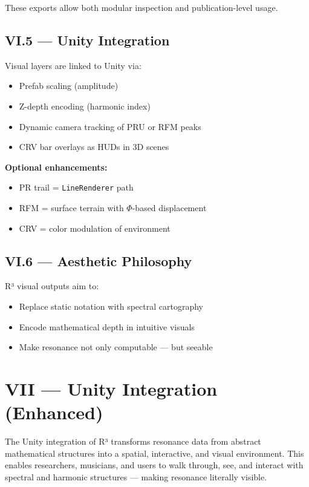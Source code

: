 \documentclass{article}
\begin{document}
These exports allow both modular inspection and publication-level usage.

\subsection*{VI.5 — Unity Integration}

Visual layers are linked to Unity via:

\begin{itemize}
    \item Prefab scaling (amplitude)
    \item Z-depth encoding (harmonic index)
    \item Dynamic camera tracking of PRU or RFM peaks
    \item CRV bar overlays as HUDs in 3D scenes
\end{itemize}

\textbf{Optional enhancements:}

\begin{itemize}
    \item PR trail = \texttt{LineRenderer} path
    \item RFM = surface terrain with $\Phi$-based displacement
    \item CRV = color modulation of environment
\end{itemize}

\subsection*{VI.6 — Aesthetic Philosophy}

R³ visual outputs aim to:

\begin{itemize}
    \item Replace static notation with spectral cartography
    \item Encode mathematical depth in intuitive visuals
    \item Make resonance not only computable — but seeable
\end{itemize}

\section*{VII — Unity Integration (Enhanced)}

The Unity integration of R³ transforms resonance data from abstract mathematical structures into a spatial, interactive, and visual environment. This enables researchers, musicians, and users to walk through, see, and interact with spectral and harmonic structures — making resonance literally visible.
\end{document}
